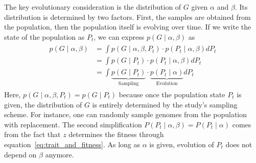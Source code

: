 The key evolutionary consideration is the distribution of $G$ given $\alpha$ and $\beta$.
Its distribution is determined by two factors.
First, the samples are obtained from the population, then the population itself is evolving over time.
If we write the state of the population as $P_t$,
we can express $p(G \mid \alpha, \beta)$ as
\begin{align} \label{eq:definetti}
    \begin{aligned}
        p(G \mid \alpha, \beta) &=
        \int p(G \mid \alpha, \beta ,P_t)
        \cdot p(P_t \mid \alpha, \beta) dP_t \\
        &=
        \int p(G \mid P_t)
        \cdot p(P_t \mid \alpha, \beta) dP_t \\
        &=
        \int \underbrace{p(G \mid P_t)}_{\text{Sampling}}
        \cdot \underbrace{p(P_t \mid \alpha)}_{\text{Evolution}} dP_t
    \end{aligned}
\end{align}
Here, $p(G \mid \alpha, \beta, P_t) = p(G \mid P_t)$ because once the population state $P_t$ is given, the distribution of $G$ is entirely determined by the study's sampling scheme.
For instance, one can randomly sample genomes from the population with replacement.
The second simplification $P(P_t \mid \alpha, \beta) = P(P_t \mid \alpha)$ comes from the fact that $z$ determines the fitness through equation~\ref{eq:trait_and_fitness}.
As long as $\alpha$ is given, evolution of $P_t$ does not depend on $\beta$ anymore.

